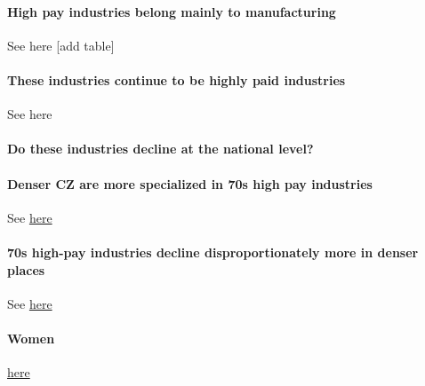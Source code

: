 \paragraph{High pay industries belong mainly to manufacturing}
See here  [add table]

\paragraph{These industries continue to be highly paid industries}
See here

\paragraph{Do these industries decline at the national level?}





\paragraph{Denser CZ are more specialized in 70s high pay industries}


See \href{https://www.dropbox.com/s/dwse5a96c5xl2xx/high_pay_ind_density_full_time.png?dl=0}{here}

\paragraph{70s high-pay industries decline disproportionately more in denser places}
See \href{https://www.dropbox.com/s/dwse5a96c5xl2xx/high_pay_ind_density_full_time.png?dl=0}{here}

\paragraph{Women }
\href{https://www.dropbox.com/s/dwse5a96c5xl2xx/high_pay_ind_density_full_time.png?dl=0}{here}




